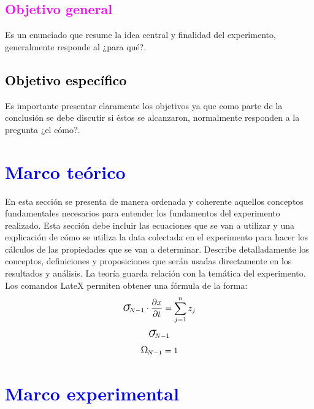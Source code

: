 \documentclass[11pt]{article}
\begin{document}
\begin{multicols}{2}
        \subsection{\textcolor{magenta}{Objetivo general}}
        \noindent Es un enunciado que resume la idea central y finalidad del experimento, generalmente responde al ¿para qué?.

        \subsection{\textbf{\textcolor{black}{Objetivo específico}}}
        \noindent Es importante presentar claramente los objetivos ya que como parte de la conclusión se debe discutir si éstos se alcanzaron, normalmente responden a la pregunta ¿el cómo?.


        \section{\textbf{\textcolor{blue}{Marco teórico}}}
        \noindent En esta sección se presenta de manera ordenada y coherente aquellos conceptos fundamentales necesarios para entender los fundamentos del experimento realizado. Esta sección debe incluir las ecuaciones que se van a utilizar y una explicación de cómo se utiliza la data colectada en el experimento para hacer los cálculos de las propiedades que se van a determinar. Describe detalladamente los conceptos, definiciones y proposiciones que serán usadas directamente en los resultados y análisis. La teoría guarda relación con la temática del experimento.\\
        Los comandos LateX permiten obtener una fórmula de la forma:
        \begin{equation}
            \textup{\LARGE $\sigma$}_{\hspace{-0.1cm}N-1} \cdot \frac{\partial x}{\partial t} = \sum_{j=1}^{n}z_{j}
        \end{equation}
        \begin{equation}
            \textup{\LARGE $\sigma$}_{\hspace{-0.1cm}N-1}
        \end{equation}
        \begin{equation}
            \textup{\large $\Omega$}_{\hspace{-0.03cm}N-1}=1
        \end{equation}


        \section{\textbf{\textcolor{blue}{Marco experimental}}}


\end{multicols}
\end{document}
